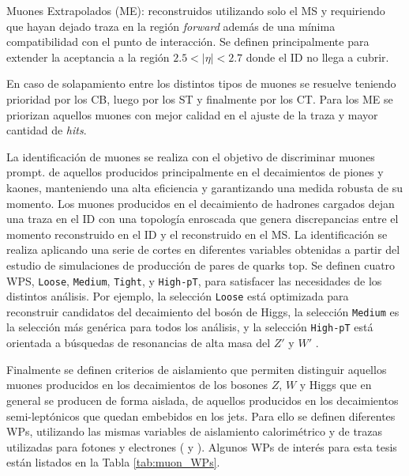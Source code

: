 Muones Extrapolados (ME): reconstruidos utilizando solo el MS y requiriendo que hayan dejado traza en la región \textit{forward} además de una mínima compatibilidad con el punto de interacción. Se definen principalmente para extender la aceptancia a la región $2.5<|\eta|<2.7$ donde el ID no llega a cubrir.


En caso de solapamiento entre los distintos tipos de muones se resuelve teniendo prioridad por los CB, luego por los ST y finalmente por los CT. Para los ME se priorizan aquellos muones con mejor calidad en el ajuste de la traza y mayor cantidad de \textit{hits}.

La identificación de muones se realiza con el objetivo de discriminar muones prompt. de aquellos producidos principalmente en el decaimientos de piones y kaones, manteniendo una alta eficiencia y garantizando una medida robusta de su momento. Los muones producidos en el decaimiento de hadrones cargados dejan una traza en el ID con una topología enroscada 
que genera discrepancias entre el momento reconstruido en el ID y el reconstruido en el MS. La identificación se realiza aplicando una serie de cortes en diferentes variables \cite{PERF-2015-10} obtenidas a partir del estudio de simulaciones de producción de pares de quarks top. Se definen cuatro WPS, \texttt{Loose}, \texttt{Medium}, \texttt{Tight}, y \texttt{High-pT}, para satisfacer las necesidades de los distintos análisis. Por ejemplo, la selección \texttt{Loose} está optimizada para reconstruir candidatos del decaimiento del bosón de Higgs, la selección \texttt{Medium} es la selección más genérica para todos los análisis, y la selección \texttt{High-pT} está orientada a búsquedas de resonancias de alta masa del $Z'$ y $W'$ \cite{EXOT-2016-18,EXOT-2016-06,EXOT-2016-05,EXOT-2015-04}. 

Finalmente se definen criterios de aislamiento que permiten distinguir aquellos muones producidos en los decaimientos de los bosones $Z$, $W$ y Higgs que en general se producen de forma aislada, de aquellos producidos en los decaimientos semi-leptónicos que quedan embebidos en los jets. Para ello se definen diferentes
WPs, utilizando las mismas variables de aislamiento calorimétrico y de trazas utilizadas para fotones y electrones ( y ). Algunos WPs de interés para esta tesis están listados en la {Tabla \ref{tab:muon_WPs}}.



